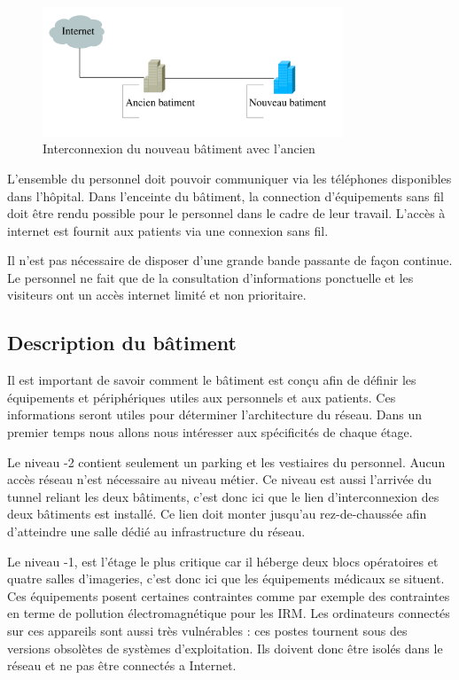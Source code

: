 %
    \cleardoublepage
%

\begin{figure}[!ht]
    \center
    \includegraphics[width=0.8\textwidth]{./images/interco-batiment.png}
    \caption{Interconnexion du nouveau bâtiment avec l'ancien}
\end{figure}

%

L'ensemble du personnel doit pouvoir communiquer via les téléphones disponibles dans l'hôpital.
Dans l'enceinte du bâtiment, la connection d'équipements sans fil doit être rendu possible pour le personnel dans le cadre de leur travail.
L'accès à internet est fournit aux patients via une connexion sans fil.

Il n'est pas nécessaire de disposer d'une grande bande passante de façon continue.
Le personnel ne fait que de la consultation d'informations ponctuelle et les visiteurs ont un accès internet limité et non prioritaire.


%
    \cleardoublepage
%
%
\subsection{Description du bâtiment}

Il est important de savoir comment le bâtiment est conçu afin de définir les équipements et périphériques utiles aux personnels et aux patients.
Ces informations seront utiles pour déterminer l'architecture du réseau.
Dans un premier temps nous allons nous intéresser aux spécificités de chaque étage.

Le niveau -2 contient seulement un parking et les vestiaires du personnel.
Aucun accès réseau n'est nécessaire au niveau métier.
Ce niveau est aussi l'arrivée du tunnel reliant les deux bâtiments, c'est donc ici que le lien d'interconnexion des deux bâtiments est installé.
Ce lien doit monter jusqu'au rez-de-chaussée afin d'atteindre une salle dédié au infrastructure du réseau.

Le niveau -1, est l'étage le plus critique car il héberge deux blocs opératoires et quatre salles d'imageries, c'est donc ici que les équipements médicaux se situent.
Ces équipements posent certaines contraintes comme par exemple des contraintes en terme de pollution électromagnétique pour les IRM.
Les ordinateurs connectés sur ces appareils sont aussi très vulnérables : ces postes tournent sous des versions obsolètes de systèmes d'exploitation.
Ils doivent donc être isolés dans le réseau et ne pas être connectés a Internet.

